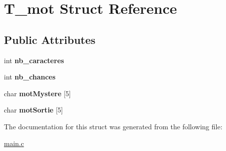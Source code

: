 \hypertarget{structT__mot}{}\section{T\+\_\+mot Struct Reference}
\label{structT__mot}
\subsection*{Public Attributes}
\begin{DoxyCompactItemize}
\item 
int {\bfseries nb\+\_\+caracteres}\hypertarget{structT__mot_a4549670a531e21e5167ac7407f69f662}{}\label{structT__mot_a4549670a531e21e5167ac7407f69f662}

\item 
int {\bfseries nb\+\_\+chances}\hypertarget{structT__mot_a96bcf38759b9974b0becf5a15600f074}{}\label{structT__mot_a96bcf38759b9974b0becf5a15600f074}

\item 
char {\bfseries mot\+Mystere} \mbox{[}5\mbox{]}\hypertarget{structT__mot_aff4e2b2006a6aef7c53779b25f48fdfa}{}\label{structT__mot_aff4e2b2006a6aef7c53779b25f48fdfa}

\item 
char {\bfseries mot\+Sortie} \mbox{[}5\mbox{]}\hypertarget{structT__mot_ae645e27fe19af06859bb0457000be528}{}\label{structT__mot_ae645e27fe19af06859bb0457000be528}

\end{DoxyCompactItemize}


The documentation for this struct was generated from the following file\+:\begin{DoxyCompactItemize}
\item 
\hyperlink{main_8c}{main.\+c}\end{DoxyCompactItemize}
